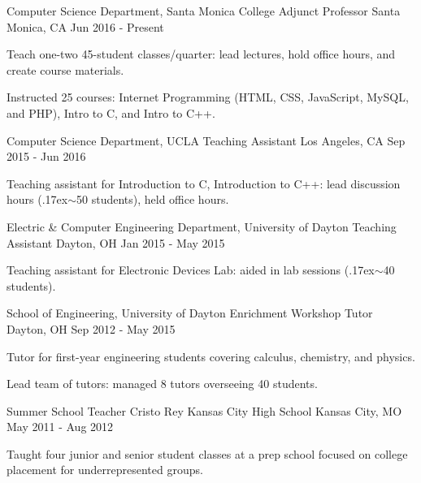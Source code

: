 


\begin{cventries}

\cventry
{Computer Science Department, Santa Monica College}
{Adjunct Professor}
{Santa Monica, CA}
{Jun 2016 - Present}
{
\begin{cvitems}
  \item Teach one-two 45-student classes/quarter: lead lectures, hold office hours, and create course materials.
  \item Instructed 25 courses: Internet Programming (HTML, CSS, JavaScript, MySQL, and PHP), Intro to C, and Intro to C++.
\end{cvitems}
}


\cventry
{Computer Science Department, UCLA}
{Teaching Assistant}
{Los Angeles, CA}
{Sep 2015 - Jun 2016}
{
\begin{cvitems}
  \item Teaching assistant for Introduction to C, Introduction to C++: lead discussion hours ({\raise.17ex\hbox{$\scriptstyle\sim$}}50 students), held office hours.
\end{cvitems}
}

\cventry
{Electric \& Computer Engineering Department, University of Dayton}
{Teaching Assistant}
{Dayton, OH}
{Jan 2015 - May 2015}
{
\begin{cvitems}
  \item Teaching assistant for Electronic Devices Lab: aided in lab sessions ({\raise.17ex\hbox{$\scriptstyle\sim$}}40 students).
\end{cvitems}
}

\cventry
{School of Engineering, University of Dayton}
{Enrichment Workshop Tutor}
{Dayton, OH}
{Sep 2012 - May 2015}
{
\begin{cvitems}
  \item Tutor for first-year engineering students covering calculus, chemistry, and physics.
  \item Lead team of tutors: managed 8 tutors overseeing 40 students.
\end{cvitems}
}


\cventry
{Summer School Teacher}
{Cristo Rey Kansas City High School}
{Kansas City, MO}
{May 2011 - Aug 2012}
{
\begin{cvitems}
\item Taught four junior and senior student classes at a prep school focused on college placement for underrepresented groups.
\end{cvitems}
}

\end{cventries}